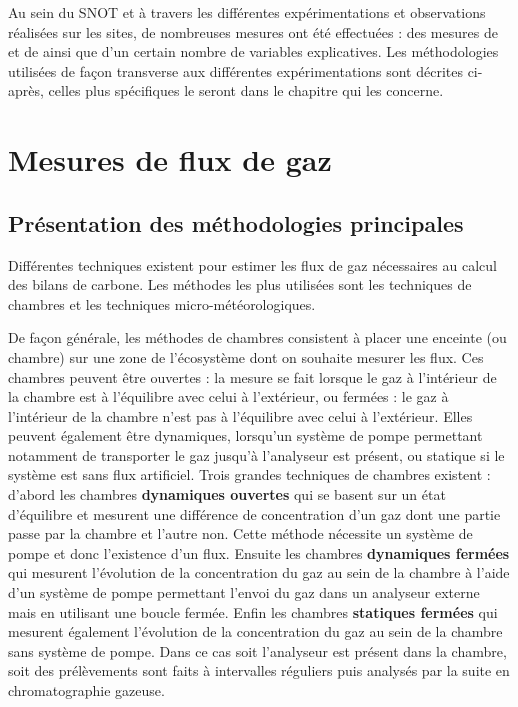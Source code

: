 Au sein du SNOT et à travers les différentes expérimentations et observations réalisées sur les sites, de nombreuses mesures ont été effectuées : des mesures de \coo et de \chh ainsi que d'un certain nombre de variables explicatives.
Les méthodologies utilisées de façon transverse aux différentes expérimentations sont décrites ci-après, celles plus spécifiques le seront dans le chapitre qui les concerne.

\section{Mesures de flux de gaz}
\label{sec:clsd_chbr_method}

\subsection{Présentation des méthodologies principales}


Différentes techniques existent pour estimer les flux de gaz nécessaires au calcul des bilans de carbone.
Les méthodes les plus utilisées sont les techniques de chambres et les techniques micro-météorologiques.

De façon générale, les méthodes de chambres consistent à placer une enceinte (ou chambre) sur une zone de l'écosystème dont on souhaite mesurer les flux.
Ces chambres peuvent être ouvertes : la mesure se fait lorsque le gaz à l'intérieur de la chambre est à l'équilibre avec celui à l'extérieur, ou fermées : le gaz à l'intérieur de la chambre n'est pas à l'équilibre avec celui à l'extérieur.
Elles peuvent également être dynamiques, lorsqu'un système de pompe permettant notamment de transporter le gaz jusqu'à l'analyseur est présent, ou statique si le système est sans flux artificiel.
Trois grandes techniques de chambres existent : d'abord les chambres \textbf{dynamiques ouvertes} qui se basent sur un état d'équilibre et mesurent une différence de concentration d'un gaz dont une partie passe par la chambre et l'autre non. 
Cette méthode nécessite un système de pompe et donc l'existence d'un flux.
Ensuite les chambres \textbf{dynamiques fermées} qui mesurent l'évolution de la concentration du gaz au sein de la chambre à l'aide d'un système de pompe permettant l'envoi du gaz dans un analyseur externe mais en utilisant une boucle fermée.
Enfin les chambres \textbf{statiques fermées} qui mesurent également l'évolution de la concentration du gaz au sein de la chambre sans système de pompe.
Dans ce cas soit l'analyseur est présent dans la chambre, soit des prélèvements sont faits à intervalles réguliers puis analysés par la suite en chromatographie gazeuse.

